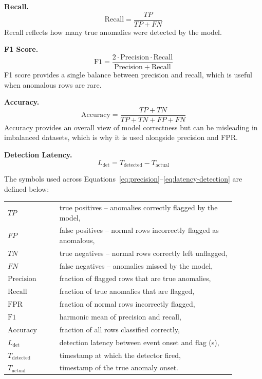 \textbf{Recall.}
\begin{equation}
\mathrm{Recall} = \frac{TP}{TP + FN}
\label{eq:recall}
\end{equation}
Recall reflects how many true anomalies were detected by the model.

\textbf{F1 Score.}
\begin{equation}
\mathrm{F1} = \frac{2 \cdot \mathrm{Precision} \cdot \mathrm{Recall}}{\mathrm{Precision} + \mathrm{Recall}}
\label{eq:f1}
\end{equation}
F1 score provides a single balance between precision and recall, which is useful when anomalous rows are rare.

\textbf{Accuracy.}
\begin{equation}
\mathrm{Accuracy} = \frac{TP + TN}{TP + TN + FP + FN}
\label{eq:accuracy}
\end{equation}
Accuracy provides an overall view of model correctness but can be misleading in imbalanced datasets, which is why it is used alongside precision and FPR.

\textbf{Detection Latency.}
\begin{equation}
L_{\mathrm{det}} = T_{\mathrm{detected}} - T_{\mathrm{actual}}
\label{eq:latency-detection}
\end{equation}

\noindent
The symbols used across Equations~\ref{eq:precision}--\ref{eq:latency-detection} are defined below:
\begin{center}
\noindent\begin{tabular}{@{}p{0.20\linewidth}@{\quad}p{0.68\linewidth}@{}}
$TP$ & true positives -- anomalies correctly flagged by the model, \\
$FP$ & false positives -- normal rows incorrectly flagged as anomalous, \\
$TN$ & true negatives -- normal rows correctly left unflagged, \\
$FN$ & false negatives -- anomalies missed by the model, \\
$\mathrm{Precision}$ & fraction of flagged rows that are true anomalies, \\
$\mathrm{Recall}$ & fraction of true anomalies that are flagged, \\
$\mathrm{FPR}$ & fraction of normal rows incorrectly flagged, \\
$\mathrm{F1}$ & harmonic mean of precision and recall, \\
$\mathrm{Accuracy}$ & fraction of all rows classified correctly, \\
$L_{\mathrm{det}}$ & detection latency between event onset and flag (s), \\
$T_{\mathrm{detected}}$ & timestamp at which the detector fired, \\
$T_{\mathrm{actual}}$ & timestamp of the true anomaly onset.
\end{tabular}
\end{center}


